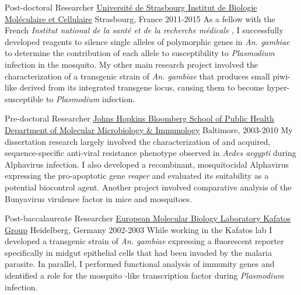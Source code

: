 
\begin{cventries}

    \cventry
    	{Post-doctoral Researcher}
    	{\href{http://www-ibmc.u-strasbg.fr/}{Universit\'{e} de Strasbourg \newline Institut de Biologie Mol\'{e}culaire et Cellulaire}}
    	{Strasbourg, France}
    	{2011-2015}
    	{As a fellow with the French \emph{Institut national de la sant\'{e} et de la recherche m\'{e}dicale} , I successfully developed reagents to silence single alleles of polymorphic genes in \emph{An. gambiae} to determine the contribution of each allele to susceptibility to \emph{Plasmodium} infection in the mosquito. My other main research project involved the characterization of a transgenic strain of \emph{An. gambiae} that produces small piwi-like  derived from its integrated transgene locus, causing them to become hyper-susceptible to \emph{Plasmodium} infection.}
    
    \cventry
    	{Pre-doctoral Researcher}
    	{\href{http://www.jhsph.edu/departments/w-harry-feinstone-department-of-molecular-microbiology-and-immunology/}{Johns Hopkins Bloomberg School of Public Health \newline Department of Molecular Microbiology \& Immunology}}
    	{Baltimore, }
    	{2003-2010}
    	{My dissertation research largely involved the characterization of and acquired, sequence-specific anti-viral resistance phenotype observed in \emph{Aedes aegypti} during Alphavirus infection. I also developed a recombinant, mosquitocidal Alphavirus expressing the pro-apoptotic gene \emph{reaper} and evaluated its suitability as a potential biocontrol agent. Another project involved comparative analysis of the Bunyavirus virulence factor  in mice and mosquitoes.}
    
    \cventry
    	{Post-baccalaureate Researcher}
    	{\href{http://www.embl.de/}{European Molecular Biology Laboratory \newline Kafatos Group}}
    	{Heidelberg, Germany}
    	{2002-2003}
    	{While working in the Kafatos lab I developed a transgenic strain of \emph{An. gambiae} expressing a fluorescent reporter specifically in midgut epithelial cells that had been invaded by the malaria parasite. In parallel, I performed functional analysis of immunity genes and identified a role for the mosquito -like transcription factor \emph{} during \emph{Plasmodium} infection.}    


\end{cventries}

